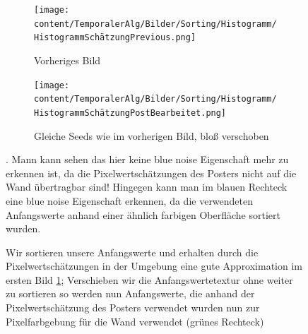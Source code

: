 \begin{figure}[H]

    \begin{subfigure}{\textwidth}
        \centering \texttt{[image: content/TemporalerAlg/Bilder/Sorting/Histogramm/HistogrammSchätzungPrevious.png]} 
        \caption{Vorheriges Bild}
        \label{fig:Histogramm_Previous}
    \end{subfigure}
    \begin{subfigure}{\textwidth}
        \centering \texttt{[image: content/TemporalerAlg/Bilder/Sorting/Histogramm/HistogrammSchätzungPostBearbeitet.png]}
        \caption{Gleiche Seeds wie im vorherigen Bild, bloß verschoben}
        \label{fig:Histogram_Post}
    \end{subfigure}
        \caption{Wir sortieren unsere Anfangswerte und erhalten durch die Pixelwertschätzungen in der Umgebung eine gute Approximation im ersten Bild
        \ref{fig:Histogramm_Previous}; Verschieben wir die Anfangswertetextur ohne weiter zu sortieren so werden nun Anfangswerte, die anhand der Pixelwertschätzung des
        Posters verwendet wurden nun zur Pixelfarbgebung für die Wand verwendet (grünes Rechteck)}. Mann kann sehen das hier keine blue noise Eigenschaft mehr zu erkennen
        ist, da die Pixelwertschätzungen des Posters nicht auf die Wand übertragbar sind! Hingegen kann man im blauen Rechteck eine blue noise Eigenschaft erkennen, da 
        die verwendeten Anfangswerte anhand einer ähnlich farbigen Oberfläche sortiert wurden. 
        \label{fig:Vergleich der Histogramme}

\end{figure}


\newpage

